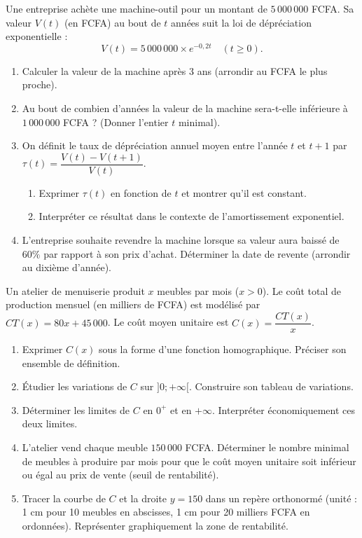 \documentclass[11pt]{article}
\begin{document}
\begin{exercice}
Une entreprise achète une machine-outil pour un montant de $5\,000\,000$ FCFA. Sa valeur $V(t)$ (en FCFA) au bout de $t$ années suit la loi de dépréciation exponentielle :
\[ V(t) = 5\,000\,000 \times e^{-0,2t} \quad (t \ge 0). \]
\begin{enumerate}
    \item Calculer la valeur de la machine après 3 ans (arrondir au FCFA le plus proche).
    \item Au bout de combien d'années la valeur de la machine sera-t-elle inférieure à $1\,000\,000$ FCFA ? (Donner l'entier $t$ minimal).
    \item On définit le taux de dépréciation annuel moyen entre l'année $t$ et $t+1$ par $\tau(t) = \dfrac{V(t)-V(t+1)}{V(t)}$.
    \begin{enumerate}
        \item Exprimer $\tau(t)$ en fonction de $t$ et montrer qu'il est constant.
        \item Interpréter ce résultat dans le contexte de l'amortissement exponentiel.
    \end{enumerate}
    \item L'entreprise souhaite revendre la machine lorsque sa valeur aura baissé de $60\%$ par rapport à son prix d'achat. Déterminer la date de revente (arrondir au dixième d'année).
\end{enumerate}
\end{exercice}

\begin{exercice}
Un atelier de menuiserie produit $x$ meubles par mois ($x > 0$). Le coût total de production mensuel (en milliers de FCFA) est modélisé par $CT(x) = 80x + 45\,000$.
Le coût moyen unitaire est $C(x) = \dfrac{CT(x)}{x}$.
\begin{enumerate}
    \item Exprimer $C(x)$ sous la forme d'une fonction homographique. Préciser son ensemble de définition.
    \item Étudier les variations de $C$ sur $]0;+\infty[$. Construire son tableau de variations.
    \item Déterminer les limites de $C$ en $0^+$ et en $+\infty$. Interpréter économiquement ces deux limites.
    \item L'atelier vend chaque meuble $150\,000$ FCFA. Déterminer le nombre minimal de meubles à produire par mois pour que le coût moyen unitaire soit inférieur ou égal au prix de vente (seuil de rentabilité).
    \item Tracer la courbe de $C$ et la droite $y=150$ dans un repère orthonormé (unité : 1 cm pour 10 meubles en abscisses, 1 cm pour 20 milliers FCFA en ordonnées). Représenter graphiquement la zone de rentabilité.
\end{enumerate}
\end{exercice}
\end{document}
